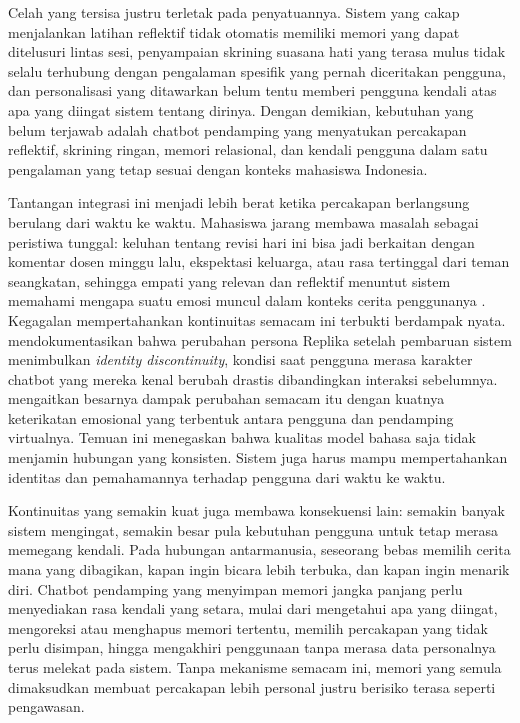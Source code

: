 Celah yang tersisa justru terletak pada penyatuannya. Sistem yang cakap menjalankan latihan reflektif tidak otomatis memiliki memori yang dapat ditelusuri lintas sesi, penyampaian skrining suasana hati yang terasa mulus tidak selalu terhubung dengan pengalaman spesifik yang pernah diceritakan pengguna, dan personalisasi yang ditawarkan belum tentu memberi pengguna kendali atas apa yang diingat sistem tentang dirinya. Dengan demikian, kebutuhan yang belum terjawab adalah chatbot pendamping yang menyatukan percakapan reflektif, skrining ringan, memori relasional, dan kendali pengguna dalam satu pengalaman yang tetap sesuai dengan konteks mahasiswa Indonesia.

Tantangan integrasi ini menjadi lebih berat ketika percakapan berlangsung berulang dari waktu ke waktu. Mahasiswa jarang membawa masalah sebagai peristiwa tunggal: keluhan tentang revisi hari ini bisa jadi berkaitan dengan komentar dosen minggu lalu, ekspektasi keluarga, atau rasa tertinggal dari teman seangkatan, sehingga empati yang relevan dan reflektif menuntut sistem memahami mengapa suatu emosi muncul dalam konteks cerita penggunanya \parencite{bickmorePicard2005}. Kegagalan mempertahankan kontinuitas semacam ini terbukti berdampak nyata. \textcite{defreitasReplika2024} mendokumentasikan bahwa perubahan persona Replika setelah pembaruan sistem menimbulkan \textit{identity discontinuity}, kondisi saat pengguna merasa karakter chatbot yang mereka kenal berubah drastis dibandingkan interaksi sebelumnya. \textcite{boine2023} mengaitkan besarnya dampak perubahan semacam itu dengan kuatnya keterikatan emosional yang terbentuk antara pengguna dan pendamping virtualnya. Temuan ini menegaskan bahwa kualitas model bahasa saja tidak menjamin hubungan yang konsisten. Sistem juga harus mampu mempertahankan identitas dan pemahamannya terhadap pengguna dari waktu ke waktu.

Kontinuitas yang semakin kuat juga membawa konsekuensi lain: semakin banyak sistem mengingat, semakin besar pula kebutuhan pengguna untuk tetap merasa memegang kendali. Pada hubungan antarmanusia, seseorang bebas memilih cerita mana yang dibagikan, kapan ingin bicara lebih terbuka, dan kapan ingin menarik diri. Chatbot pendamping yang menyimpan memori jangka panjang perlu menyediakan rasa kendali yang setara, mulai dari mengetahui apa yang diingat, mengoreksi atau menghapus memori tertentu, memilih percakapan yang tidak perlu disimpan, hingga mengakhiri penggunaan tanpa merasa data personalnya terus melekat pada sistem. Tanpa mekanisme semacam ini, memori yang semula dimaksudkan membuat percakapan lebih personal justru berisiko terasa seperti pengawasan.

